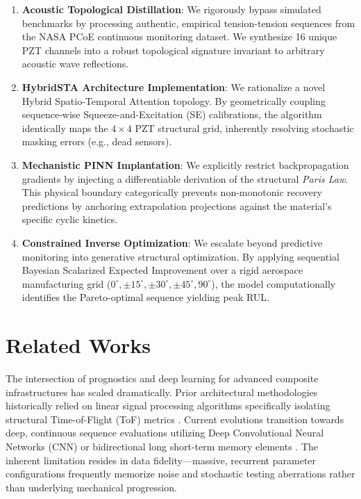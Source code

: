 \documentclass[conference]{IEEEtran}
\begin{document}
\begin{enumerate}
    \item \textbf{Acoustic Topological Distillation}: We rigorously bypass simulated benchmarks by processing authentic, empirical tension-tension sequences from the NASA PCoE continuous monitoring dataset. We synthesize 16 unique PZT channels into a robust topological signature invariant to arbitrary acoustic wave reflections.
    \item \textbf{HybridSTA Architecture Implementation}: We rationalize a novel Hybrid Spatio-Temporal Attention topology. By geometrically coupling sequence-wise Squeeze-and-Excitation (SE) calibrations, the algorithm identically maps the $4\times4$ PZT structural grid, inherently resolving stochastic masking errors (e.g., dead sensors). 
    \item \textbf{Mechanistic PINN Implantation}: We explicitly restrict backpropagation gradients by injecting a differentiable derivation of the structural \textit{Paris Law}. This physical boundary categorically prevents non-monotonic recovery predictions by anchoring extrapolation projections against the material's specific cyclic kinetics.
    \item \textbf{Constrained Inverse Optimization}: We escalate beyond predictive monitoring into generative structural optimization. By applying sequential Bayesian Scalarized Expected Improvement over a rigid aerospace manufacturing grid ($0^\circ, \pm 15^\circ, \pm 30^\circ, \pm 45^\circ, 90^\circ$), the model computationally identifies the Pareto-optimal sequence yielding peak RUL. 
\end{enumerate}

\section{Related Works}

The intersection of prognostics and deep learning for advanced composite infrastructures has scaled dramatically. Prior architectural methodologies historically relied on linear signal processing algorithms specifically isolating structural Time-of-Flight (ToF) metrics \cite{su2009identification, ray2018machine}. Current evolutions transition towards deep, continuous sequence evaluations utilizing Deep Convolutional Neural Networks (CNN) \cite{khan2019damage, chen2025residual} or bidirectional long short-term memory elements \cite{zhang2018long}. The inherent limitation resides in data fidelity—massive, recurrent parameter configurations frequently memorize noise and stochastic testing aberrations rather than underlying mechanical progression.
\end{document}
